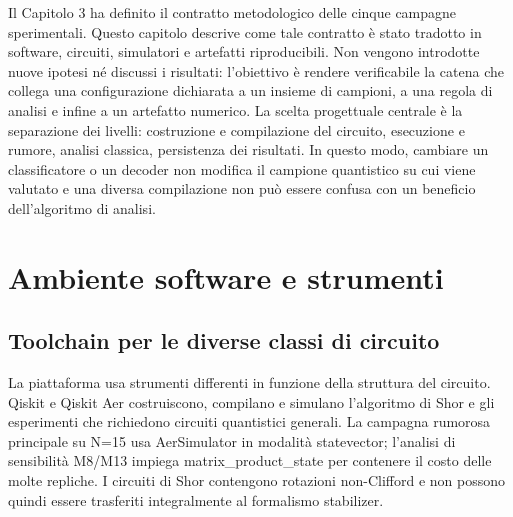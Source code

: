 
Il Capitolo 3 ha definito il contratto metodologico delle cinque campagne sperimentali. Questo capitolo descrive come tale contratto è stato tradotto in software, circuiti, simulatori e artefatti riproducibili. Non vengono introdotte nuove ipotesi né discussi i risultati: l'obiettivo è rendere verificabile la catena che collega una configurazione dichiarata a un insieme di campioni, a una regola di analisi e infine a un artefatto numerico. La scelta progettuale centrale è la separazione dei livelli: costruzione e compilazione del circuito, esecuzione e rumore, analisi classica, persistenza dei risultati. In questo modo, cambiare un classificatore o un decoder non modifica il campione quantistico su cui viene valutato e una diversa compilazione non può essere confusa con un beneficio dell'algoritmo di analisi.

\section{Ambiente software e strumenti}\label{sec:finale_4_1}

\subsection{Toolchain per le diverse classi di circuito}\label{sec:finale_4_1_1}

La piattaforma usa strumenti differenti in funzione della struttura del circuito. Qiskit e Qiskit Aer \cite{qiskit2023} costruiscono, compilano e simulano l'algoritmo di Shor e gli esperimenti che richiedono circuiti quantistici generali. La campagna rumorosa principale su N=15 usa AerSimulator in modalità statevector; l'analisi di sensibilità M8/M13 impiega matrix\_product\_state per contenere il costo delle molte repliche. I circuiti di Shor contengono rotazioni non-Clifford e non possono quindi essere trasferiti integralmente al formalismo stabilizer.

